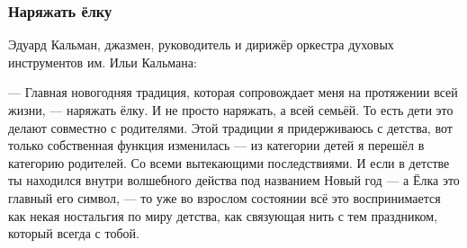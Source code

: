 
\subsubsection{Наряжать ёлку}

Эдуард Кальман, джазмен, руководитель и дирижёр оркестра духовых инструментов
им. Ильи Кальмана:

\begin{zzquote}
— Главная новогодняя традиция, которая сопровождает меня на протяжении всей
жизни, — наряжать ёлку. И не просто наряжать, а всей семьёй. То есть дети это
делают совместно с родителями. Этой традиции я придерживаюсь с детства, вот
только собственная функция изменилась — из категории детей я перешёл в
категорию родителей. Со всеми вытекающими последствиями. И если в детстве ты
находился внутри волшебного действа под названием Новый год — а Ёлка это
главный его символ, — то уже во взрослом состоянии всё это воспринимается как
некая ностальгия по миру детства, как связующая нить с тем праздником, который
всегда с тобой.
\end{zzquote}

